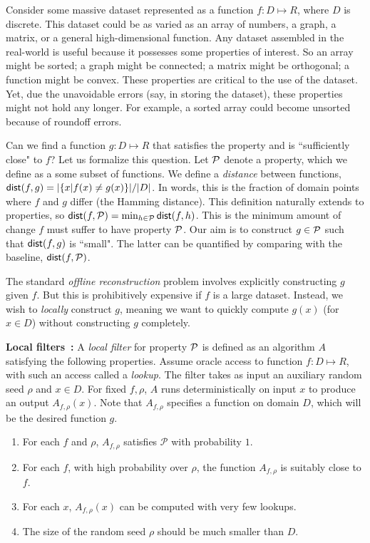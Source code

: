 \documentclass[natbib]{svcyclop}
\def\dist{{\sf dist}}
\begin{document}
\ProbDef

Consider some massive dataset represented as a function $f: D \mapsto R$,
where $D$ is discrete.
This dataset could be as varied as an array of numbers, a graph, a matrix, or a general high-dimensional function.
Any dataset assembled in the real-world is useful because it possesses some 
properties of interest. So an array might be sorted; a graph might be 
connected; a matrix might be orthogonal; a function might be convex. These properties are critical to the use
of the dataset. Yet, due the unavoidable errors (say, in storing the dataset), these
properties might not hold any longer. For example, a sorted array could become unsorted because of roundoff errors.

Can we find a function $g: D \mapsto R$ that satisfies the property and is ``sufficiently close"
to $f$? Let us formalize this question. Let $\mathcal{P}$ denote a property, which we define as a some subset
of functions. We define a \emph{distance} between functions, $\dist(f,g) = |\{x | f(x) \neq g(x)\}|/|D|$. In words, this is the fraction
of domain points where $f$ and $g$ differ (the Hamming distance). This definition naturally extends to properties,
so $\dist(f,\cP) = \min_{h \in \cP} \dist(f,h)$. This is the minimum amount of change $f$
must suffer to have property $\mathcal{P}$.
Our aim is to construct $g \in \mathcal{P}$ such that $\dist(f,g)$ is ``small". The latter can be quantified
by comparing with the baseline, $\dist(f,\cP)$.


The standard \emph{offline reconstruction} problem involves explicitly constructing $g$ given $f$.
But this is prohibitively expensive if $f$ is a large dataset. Instead, we wish to \emph{locally} construct $g$,
meaning we want to quickly compute $g(x)$ (for $x \in D$) without constructing $g$ completely.

{\bf Local filters~\cite{SS06}:} A {\em local filter} for property ${\cal P}$
is defined as an algorithm $A$ satisfying the following properties.
Assume oracle access to function $f:D \mapsto R$, with such an access called a \emph{lookup}.
The filter takes
as input an auxiliary random seed $\rho$ and $x \in D$.  
For fixed $f, \rho$, $A$ runs deterministically on input $x$ to produce an output $A_{f,\rho}(x)$.
Note that $A_{f,\rho}$ specifies a function on domain $D$, which will be the desired function $g$.

\begin{enumerate}
\item \label{prop:1} For each $f$ and $\rho$,  $A_{f,\rho}$ 
satisfies $\mathcal{P}$ with probability $1$. 
\item \label{prop:2} For each $f$, with high probability over $\rho$, the function $A_{f,\rho}$ is suitably
close to $f$.
\item \label{prop:3} For each $x$, $A_{f,\rho}(x)$ can be computed with very few lookups.
\item \label{prop:4} The size of the random seed $\rho$ should be much smaller than $D$.
\end{enumerate}
\end{document}

